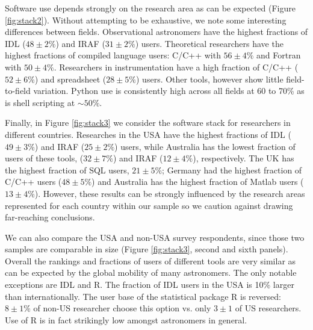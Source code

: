 Software use depends strongly on the research area as can be expected (Figure \ref{fig:stack2}). Without attempting to be exhaustive, we note some interesting differences between fields. Observational astronomers have the highest fractions of IDL ($48\pm2\%$) and IRAF ($31\pm2\%$) users. Theoretical researchers have the highest fractions of compiled language users: C/C++ with $56\pm4\%$ and Fortran with $50\pm4\%$. Researchers in instrumentation have a high fraction of C/C++ ($52\pm6\%$) and spreadsheet ($28\pm5\%$) users. Other tools, however show little field-to-field variation. Python use is consistently high across all fields at 60 to 70\% as is shell scripting at $\sim50\%$. 

Finally, in Figure \ref{fig:stack3} we consider the software stack for researchers in different countries. Researches in the USA have the highest fractions of IDL ($49\pm3\%$) and IRAF ($25\pm2\%$) users, while Australia has the lowest fraction of users of these tools, ($32\pm7\%$) and IRAF ($12\pm4\%$), respectively. The UK has the highest fraction of SQL users, $21\pm5\%$; Germany had the highest fraction of C/C++ users ($48\pm5\%$) and Australia has the highest fraction of Matlab users ($13\pm4\%$). However, these results can be strongly influenced by the research areas represented for each country within our sample so we caution against drawing far-reaching conclusions. 

We can also compare the USA and non-USA survey respondents, since those two samples are comparable in size (Figure \ref{fig:stack3}, second and sixth panels). Overall the rankings and fractions of users of different tools are very similar as can be expected by the global mobility of many astronomers. The only notable exceptions are IDL and R. The fraction of IDL users in the USA is 10\% larger than internationally. The user base of the statistical package R is reversed:  $8\pm1\%$ of non-US researcher choose this option vs. only $3\pm1$ of US researchers. Use of R is in fact strikingly low amongst astronomers in general.